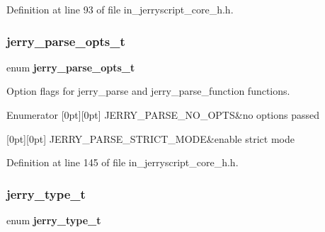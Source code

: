Definition at line 93 of file in\+\_\+jerryscript\+\_\+core\+\_\+h.\+h.

\mbox{\label{group___core_ga1f22321e9b8c5a9df0f8ddb98c3a2adf}} 
\subsubsection{jerry\_parse\_opts\_t}
{\footnotesize\ttfamily enum \textbf{ jerry\+\_\+parse\+\_\+opts\+\_\+t}}

Option flags for jerry\+\_\+parse and jerry\+\_\+parse\+\_\+function functions. \begin{DoxyEnumFields}{Enumerator}
[0pt][0pt]{}\mbox{\label{group___core_gga1f22321e9b8c5a9df0f8ddb98c3a2adfac88f60a6cb1f1dacd1eacf438e039085}} 
J\+E\+R\+R\+Y\+\_\+\+P\+A\+R\+S\+E\+\_\+\+N\+O\+\_\+\+O\+P\+TS&no options passed \\
\hline

[0pt][0pt]{}\mbox{\label{group___core_gga1f22321e9b8c5a9df0f8ddb98c3a2adfaf7b089c9f74c7d78cf41ae67ae8d0a35}} 
J\+E\+R\+R\+Y\+\_\+\+P\+A\+R\+S\+E\+\_\+\+S\+T\+R\+I\+C\+T\+\_\+\+M\+O\+DE&enable strict mode \\
\hline

\end{DoxyEnumFields}


Definition at line 145 of file in\+\_\+jerryscript\+\_\+core\+\_\+h.\+h.

\mbox{\label{group___core_ga099a735ee6114362256082b994556782}} 
\subsubsection{jerry\_type\_t}
{\footnotesize\ttfamily enum \textbf{ jerry\+\_\+type\+\_\+t}}

